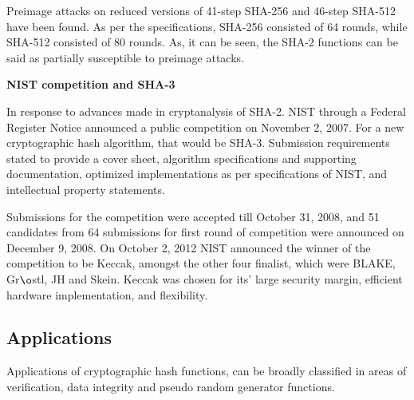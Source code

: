 \documentclass[12pt]{artikel3}                  %
\begin{document}
  Preimage attacks on reduced versions of 41-step SHA-256 and 46-step SHA-512 have been found. As per the
  specifications, SHA-256 consisted of 64 rounds, while SHA-512 consisted of 80 rounds.\cite{00011} As, it
  can be seen, the SHA-2 functions can be said as partially susceptible to preimage attacks.

  {\bf NIST competition and SHA-3}

  In response to advances made in cryptanalysis of SHA-2. NIST through a Federal Register Notice announced 
  a public competition on November 2, 2007. For a new cryptographic hash algorithm, that would be SHA-3.
  Submission requirements stated to provide a cover sheet, algorithm specifications and supporting
  documentation, optimized implementations as per specifications of NIST, and intellectual property statements.

  Submissions for the competition were accepted till October 31, 2008, and 51 candidates from 64 submissions
  for first round of competition were announced on December 9, 2008. On October 2, 2012 NIST announced the 
  winner of the competition to be Keccak, amongst the other four finalist, which were BLAKE, Gr$\o$stl, JH
  and Skein. Keccak was chosen for its' large security margin, efficient hardware implementation, and 
  flexibility.

  \subsection{Applications}

  Applications of cryptographic hash functions, can be broadly classified in areas of verification, data
  integrity and pseudo random generator functions.
\end{document}
